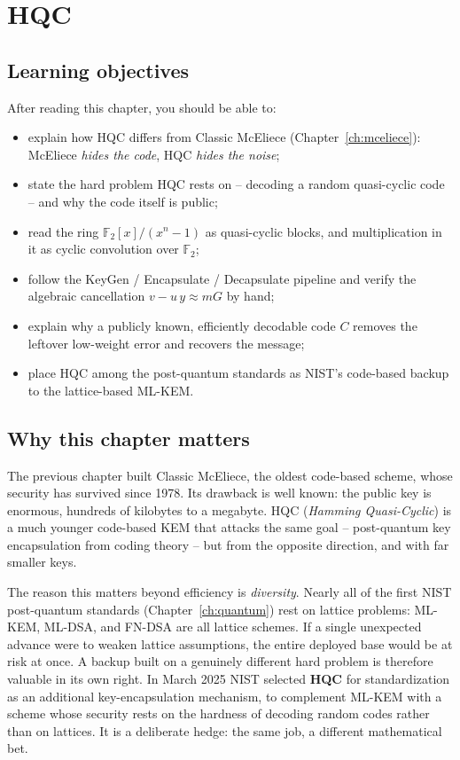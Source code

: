 \chapter{HQC}
\label{ch:hqc}

\section{Learning objectives}

After reading this chapter, you should be able to:

\begin{itemize}
  \item explain how HQC differs from Classic McEliece (Chapter~\ref{ch:mceliece}): McEliece \emph{hides the code}, HQC \emph{hides the noise};
  \item state the hard problem HQC rests on -- decoding a random quasi-cyclic code -- and why the code itself is public;
  \item read the ring $\mathbb{F}_2[x]/(x^n-1)$ as quasi-cyclic blocks, and multiplication in it as cyclic convolution over $\mathbb{F}_2$;
  \item follow the KeyGen / Encapsulate / Decapsulate pipeline and verify the algebraic cancellation $v - u\,y \approx mG$ by hand;
  \item explain why a publicly known, efficiently decodable code $C$ removes the leftover low-weight error and recovers the message;
  \item place HQC among the post-quantum standards as NIST's code-based backup to the lattice-based ML-KEM.
\end{itemize}

\section{Why this chapter matters}

The previous chapter built Classic McEliece, the oldest code-based scheme, whose security has survived since 1978. Its drawback is well known: the public key is enormous, hundreds of kilobytes to a megabyte. HQC (\emph{Hamming Quasi-Cyclic}) is a much younger code-based KEM that attacks the same goal -- post-quantum key encapsulation from coding theory -- but from the opposite direction, and with far smaller keys.

The reason this matters beyond efficiency is \emph{diversity}. Nearly all of the first NIST post-quantum standards (Chapter~\ref{ch:quantum}) rest on lattice problems: ML-KEM, ML-DSA, and FN-DSA are all lattice schemes. If a single unexpected advance were to weaken lattice assumptions, the entire deployed base would be at risk at once. A backup built on a genuinely different hard problem is therefore valuable in its own right. In March 2025 NIST selected \textbf{HQC} for standardization as an additional key-encapsulation mechanism, to complement ML-KEM with a scheme whose security rests on the hardness of decoding random codes rather than on lattices. It is a deliberate hedge: the same job, a different mathematical bet.

